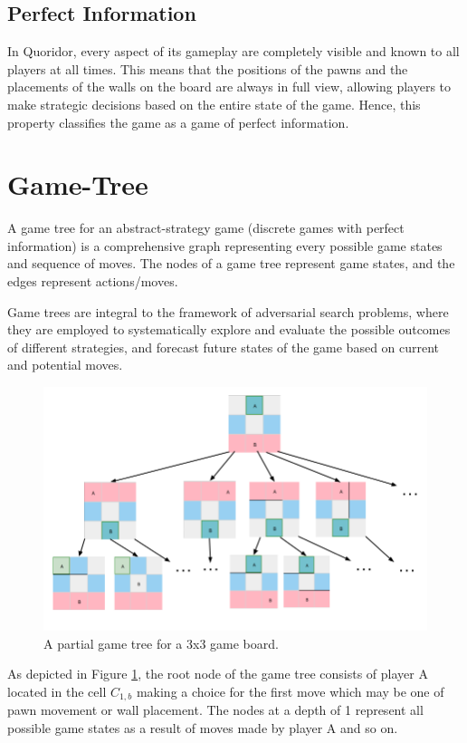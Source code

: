 \subsection{Perfect Information}
In Quoridor, every aspect of its gameplay are completely visible and known to all players at all times. This means that the positions of the pawns and the placements of the walls on the board are always in full view, allowing players to make strategic decisions based on the entire state of the game. Hence, this property classifies the game as a game of perfect information.

\section{Game-Tree}

A game tree for an abstract-strategy game (discrete games with perfect information) is a comprehensive graph representing every possible game states and sequence of moves. The nodes of a game tree represent game states, and the edges represent actions/moves.

Game trees are integral to the framework of adversarial search problems, where they are employed to systematically explore and evaluate the possible outcomes of different strategies, and forecast future states of the game based on current and potential moves.

\begin{figure}[!ht]
    \centering
    \includegraphics[scale=0.45]{../img/GameBoard/game_tree.png}
    \caption{A partial game tree for a 3x3 game board.}
    \label{fig:GameTree}
\end{figure}

As depicted in Figure \ref{fig:GameTree}, the root node of the game tree consists of player A located in the cell $C_{1, b}$ making a choice for the first move which may be one of pawn movement or wall placement. The nodes at a depth of 1 represent all possible game states as a result of moves made by player A and so on.


